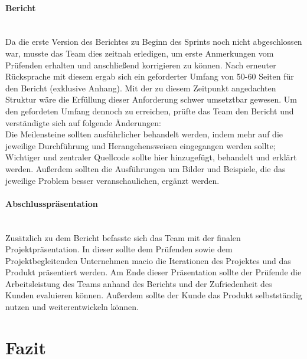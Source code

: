 \documentclass[10pt, a4paper]{article}
\begin{document}
\begin{onehalfspace}
\paragraph*{Bericht} $~$ \\
Da die erste Version des Berichtes zu Beginn des Sprints noch nicht abgeschlossen war, musste das Team dies zeitnah erledigen, um erste Anmerkungen vom Prüfenden erhalten und anschließend korrigieren zu können.
Nach erneuter Rücksprache mit diesem ergab sich ein geforderter Umfang von 50-60 Seiten für den Bericht (exklusive Anhang).
Mit der zu diesem Zeitpunkt angedachten Struktur wäre die Erfüllung dieser Anforderung schwer umsetztbar gewesen.
Um den gefordeten Umfang dennoch zu erreichen, prüfte das Team den Bericht und verständigte sich auf folgende Änderungen:\\
Die Meilensteine sollten ausführlicher behandelt werden, indem mehr auf die jeweilige Durchführung und Herangehensweisen eingegangen werden sollte;
Wichtiger und zentraler Quellcode sollte hier hinzugefügt, behandelt und erklärt werden.
Außerdem sollten die Ausführungen um Bilder und Beispiele, die das jeweilige Problem besser veranschaulichen, ergänzt werden.

\paragraph*{Abschlusspräsentation} $~$ \\
Zusätzlich zu dem Bericht befasste sich das Team mit der finalen Projektpräsentation.
In dieser sollte dem Prüfenden sowie dem Projektbegleitenden Unternehmen macio die Iterationen des Projektes und das Produkt präsentiert werden.
Am Ende dieser Präsentation sollte der Prüfende die Arbeitsleistung des Teams anhand des Berichts und der Zufriedenheit des Kunden evaluieren können. Außerdem sollte der Kunde das Produkt selbstständig nutzen und weiterentwickeln können.

\section{Fazit}

\end{onehalfspace}
\end{document}

